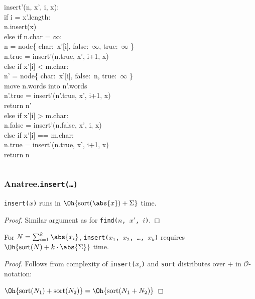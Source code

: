\documentclass[english, aspectratio=169]{beamer}
\newcommand{\sort}[1]{\text{sort}(#1)}
\begin{document}
\begin{frame}
\begin{columns}
\begin{column}{0.52\textwidth}
      insert'(n, x', i, x):\\
       {{
        \quad if i = x'.length:\\
        \qquad n.insert(x)\\
      }}
       {{
        \quad else if n.char = $\infty$:\\
        \qquad n = node\{ char:\ x'[i], false:\ $\infty$, true:\ $\infty$ \}\\
        \qquad n.true = insert'(n.true, x', i+1, x)\\
      }}
       {{
        \quad else if x'[i] < m.char:\\
        \qquad n' = node\{ char:\ x'[i], false:\ n, true:\ $\infty$ \}\\
        \qquad move n.words into n'.words\\
        \qquad n'.true = insert'(n'.true, x', i+1, x)\\
        \qquad return n'\\
      }}
       {{
      \quad else if x'[i] > m.char:\\
      \qquad n.false = insert'(n.false, x', i, x)\\
      }}
       {{
        \quad else if x'[i] == m.char:\\
        \qquad n.true = insert'(n.true, x', i+1, x)\\
      }}
       {{
        \quad return n\\
      }}
    \end{column}
  \end{columns}
\end{frame}

\begin{frame}
  \frametitle{Anatree.\texttt{insert(\dots)}}

  \begin{theorem}
    \texttt{insert($x$)} runs in $\Oh{\sort{\abs{x}} + \Sigma}$ time.
  \end{theorem}
  \begin{proof}
    Similar argument as for \texttt{find($n$, $x'$, $i$)}.
  \end{proof}

  \pause

  \begin{corollary}
    For $N = \sum_{i = 1}^k \abs{x_i}$, \texttt{insert($x_1$, $x_2$, \dots, $x_k$)} requires
    $\Oh{\sort{N} + k \cdot \abs{\Sigma}}$ time.
  \end{corollary}
  \begin{proof}
    Follows from complexity of \texttt{insert($x_i$)} and \texttt{sort} distributes over $+$ in
    $\mathcal{O}$-notation:

    \qquad $\Oh{\sort{N_1} + \sort{N_2}} = \Oh{\sort{N_1 + N_2}}$
  \end{proof}
\end{frame}
\end{document}
